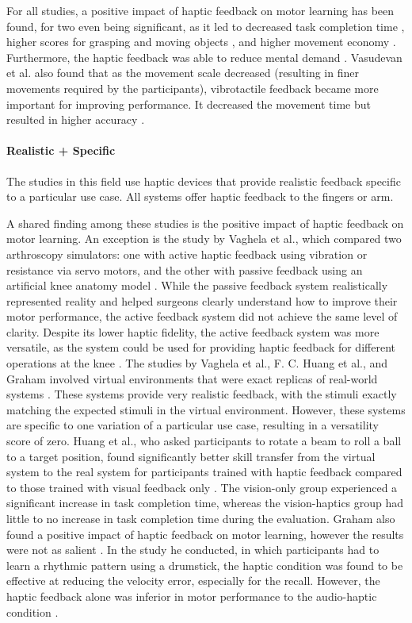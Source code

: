 For all studies, a positive impact of haptic feedback on motor learning has been found, for two even being significant, as it led to decreased task completion time \cite{Yang2023, McAnally2023}, higher scores for grasping and moving objects \cite{LiuH2019}, and higher movement economy \cite{McAnally2023}. Furthermore, the haptic feedback was able to reduce mental demand \cite{Trinitatova2023, Yang2023}.
Vasudevan et al. also found that as the movement scale decreased (resulting in finer movements required by the participants), vibrotactile feedback became more important for improving performance. It decreased the movement time but resulted in higher accuracy \cite{Vasudevan2020}. 

\paragraph{Realistic + Specific} \label{sec:realisticspecific}

The studies in this field use haptic devices that provide realistic feedback specific to a particular use case. All systems offer haptic feedback to the fingers or arm.

A shared finding among these studies is the positive impact of haptic feedback on motor learning. An exception is the study by Vaghela et al., which compared two arthroscopy simulators: one with active haptic feedback using vibration or resistance via servo motors, and the other with passive feedback using an artificial knee anatomy model \cite{Vaghela2021}. While the passive feedback system realistically represented reality and helped surgeons clearly understand how to improve their motor performance, the active feedback system did not achieve the same level of clarity. Despite its lower haptic fidelity, the active feedback system was more versatile, as the system could be used for providing haptic feedback for different operations at the knee \cite{Vaghela2021}.
The studies by Vaghela et al., F. C. Huang et al., and Graham involved virtual environments that were exact replicas of real-world systems \cite{Graham2008, Huang2006, Vaghela2021}. These systems provide very realistic feedback, with the stimuli exactly matching the expected stimuli in the virtual environment. However, these systems are specific to one variation of a particular use case, resulting in a versatility score of zero. Huang et al., who asked participants to rotate a beam to roll a ball to a target position, found significantly better skill transfer from the virtual system to the real system for participants trained with haptic feedback compared to those trained with visual feedback only \cite{Huang2006}. The vision-only group experienced a significant increase in task completion time, whereas the vision-haptics group had little to no increase in task completion time during the evaluation. Graham also found a positive impact of haptic feedback on motor learning, however the results were not as salient \cite{Graham2008}. In the study he conducted, in which participants had to learn a rhythmic pattern using a drumstick, the haptic condition was found to be effective at reducing the velocity error, especially for the recall. However, the haptic feedback alone was inferior in motor performance to the audio-haptic condition \cite{Graham2008}. 

